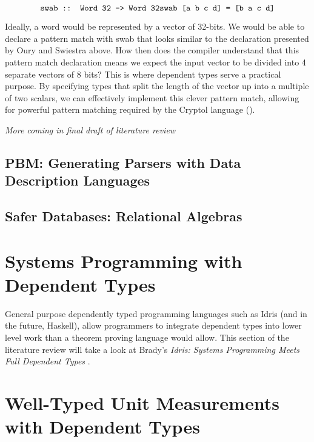 $$
\texttt{swab :: Word 32 -> Word 32} \\
\texttt{swab [a b c d] = [b a c d]} $$

Ideally, a word would be represented by a vector of 32-bits. We would be able to
declare a pattern match with swab that looks similar to the declaration
presented by Oury and Swiestra above. How then does the compiler understand that
this pattern match declaration means we expect the input vector to be divided
into 4 separate vectors of 8 bits? This is where dependent types serve a
practical purpose. By specifying types that split the length of the vector up
into a multiple of two scalars, we can effectively implement this clever pattern
match, allowing for powerful pattern matching required by the Cryptol language
(\cite{power_of_pi}). 

\textit{More coming in final draft of literature review}

\subsection{PBM: Generating Parsers with Data Description Languages}



\subsection{Safer Databases: Relational Algebras}



\section{Systems Programming with Dependent Types}

General purpose dependently typed programming languages such as Idris (and in
the future, Haskell), allow programmers to integrate dependent types into lower
level work than a theorem proving language would allow. This section of the
literature review will take a look at Brady's \textit{Idris: Systems Programming
Meets Full Dependent Types} \cite{idris_systems_programming}.

\section{Well-Typed Unit Measurements with Dependent Types}



